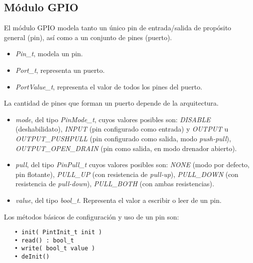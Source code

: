 \subsection{Módulo GPIO}

El módulo GPIO modela tanto un único pin de entrada/salida de propósito general (pin), así como a un conjunto de pines (puerto). 


\begin{itemize}
\item
\emph{Pin\_t}, modela un pin.
\item
\emph{Port\_t}, representa un puerto.
\item
\emph{PortValue\_t}, representa el valor de todos los pines del puerto.
\end{itemize}

La cantidad de pines que forman un puerto depende de la arquitectura.


\begin{itemize}
\item
\emph{mode}, del tipo \emph{PinMode\_t}, cuyos valores posibles son: \emph{DISABLE} (deshabilidato), \emph{INPUT} (pin configurado como entrada) y \emph{OUTPUT} u \emph{OUTPUT\_PUSHPULL} (pin configurado como salida, modo \emph{push-pull}), \emph{OUTPUT\_OPEN\_DRAIN} (pin como salida, en modo drenador abierto).
\item
\emph{pull}, del tipo \emph{PinPull\_t} cuyos valores posibles son: \emph{NONE} (modo por defecto, pin flotante), \emph{PULL\_UP} (con resistencia de \emph{pull-up}), \emph{PULL\_DOWN} (con resistencia de \emph{pull-down}), \emph{PULL\_BOTH} (con ambas resistencias).
\item
\emph{value}, del tipo \emph{bool\_t}. Representa el valor a escribir o leer de un pin.
\end{itemize}


Los métodos básicos de configuración y uso de un pin son:

\begin{verbatim}
   • init( PintInit_t init )
   • read() : bool_t
   • write( bool_t value )
   • deInit()
\end{verbatim}


